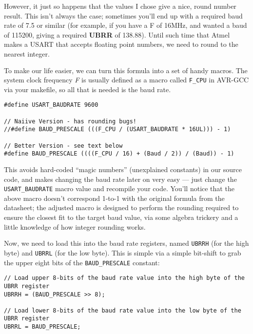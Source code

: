 \documentclass[a4paper,oneside,notitlepage]{book}
\begin{document}
However, it just so happens that the values I chose give a nice, round number result. This isn't always the case; sometimes you'll end up with a required baud rate of 7.5 or similar (for example, if you have a F of 16MHz, and wanted a baud of 115200, giving a required \textbf{UBRR} of 138.88). Until such time that Atmel makes a USART that accepts floating point numbers, we need to round to the nearest integer.

To make our life easier, we can turn this formula into a set of handy macros. The system clock frequency \emph{F} is usually defined as a macro called \texttt{F\_CPU} in AVR-GCC via your makefile, so all that is needed is the baud rate.

\begin{center}
\begin{lstlisting}
#define USART_BAUDRATE 9600

// Naiive Version - has rounding bugs!
//#define BAUD_PRESCALE (((F_CPU / (USART_BAUDRATE * 16UL))) - 1)

// Better Version - see text below
#define BAUD_PRESCALE ((((F_CPU / 16) + (Baud / 2)) / (Baud)) - 1)
\end{lstlisting}
\end{center}

This avoids hard-coded ``magic numbers'' (unexplained constants) in our source code, and makes changing the baud rate later on very easy --- just change the \texttt{USART\_BAUDRATE} macro value and recompile your code. You'll notice that the above macro doesn't correspond 1-to-1 with the original formula from the datasheet; the adjusted macro is designed to perform the rounding required to ensure the closest fit to the target baud value, via some algebra trickery and a little knowledge of how integer rounding works.

Now, we need to load this into the baud rate registers, named \texttt{UBRRH} (for the high byte) and \texttt{UBRRL} (for the low byte). This is simple via a simple bit-shift to grab the upper eight bits of the \texttt{BAUD\_PRESCALE} constant:

\begin{center}
\begin{lstlisting}
// Load upper 8-bits of the baud rate value into the high byte of the UBRR register
UBRRH = (BAUD_PRESCALE >> 8);

// Load lower 8-bits of the baud rate value into the low byte of the UBRR register
UBRRL = BAUD_PRESCALE;
\end{lstlisting}
\end{center}
\end{document}

